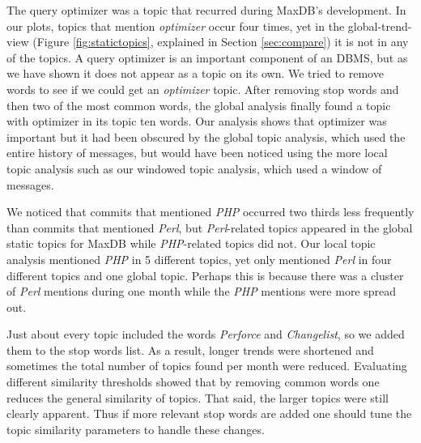 \documentclass[times, 10pt,twocolumn]{article}
\newcommand{\shrinkit}{\vspace*{-.3em}}
\begin{document}
The query optimizer was a topic that recurred during MaxDB's
development. In our plots, topics that mention \emph{optimizer} occur
four times, yet in the global-trend-view (Figure
\ref{fig:statictopics}, explained in Section \ref{sec:compare}) it is not in any of the topics. A query
optimizer is an important component of an DBMS, but as we have shown
it does not appear as a topic on its own. We tried to remove words to
see if we could get an \emph{optimizer} topic. After removing stop
words and then two of the most common words, the global analysis
finally found a topic with optimizer in its topic ten words. Our
analysis shows that optimizer was important but it had been obscured
by the global topic analysis, which used the entire history of
messages, but would have been noticed using the more local topic
analysis such as our windowed topic analysis, which used a window of
messages.


We noticed that commits that mentioned \emph{PHP} occurred two thirds
less frequently than commits that mentioned \emph{Perl}, but
\emph{Perl}-related topics appeared in the global static topics for
MaxDB while \emph{PHP}-related topics did not.  Our local topic
analysis mentioned \emph{PHP} in 5 different topics, yet only
mentioned \emph{Perl} in four different topics and one global
topic. Perhaps this is because there was a cluster of \emph{Perl}
mentions during one month while the \emph{PHP} mentions were more
spread out.

Just about every topic included the words \emph{Perforce} and
\emph{Changelist}, so we added them to the stop words list. As a
result, longer trends were shortened and sometimes the total number of
topics found per month were reduced.  Evaluating different similarity
thresholds showed that by removing common words one reduces the
general similarity of topics. That said, the larger topics were still
clearly apparent. Thus if more relevant stop words are added one
should tune the topic similarity parameters to handle these changes.





\shrinkit
{}
\shrinkit

\label{sec:compare}

\end{document}

